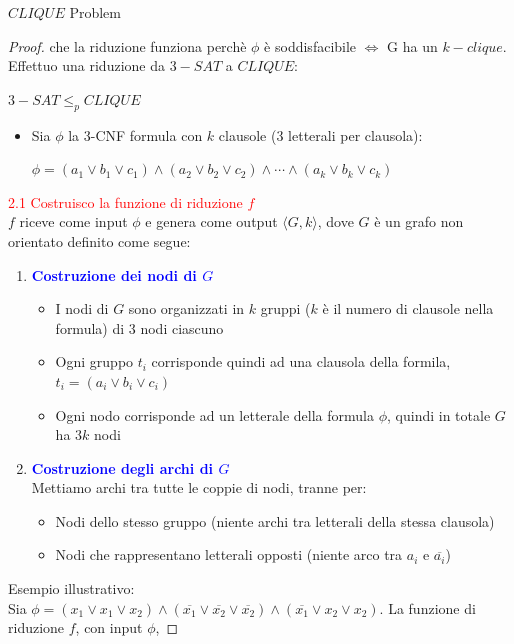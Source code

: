 \documentclass{article}  %
\theoremstyle{definition}
\begin{document}
\begin{theorem}{$CLIQUE$ Problem}
\begin{proof}
		che la riduzione funziona perchè $\phi$ è soddisfacibile $\iff$ G ha un $k-clique$. \\
		Effettuo una riduzione da $3-SAT$ a $CLIQUE$:
		\begin{center}
			$3-SAT \leq_p CLIQUE$
		\end{center}
		\begin{itemize}
			\item Sia $\phi$ la 3-CNF formula con $k$ clausole (3 letterali per clausola):
			      \begin{center}
				      $\phi = (a_1 \lor b_1 \lor c_1) \land (a_2 \lor b_2 \lor c_2) \land \cdots \land (a_k \lor b_k \lor c_k)$
			      \end{center}
		\end{itemize}
		\textcolor{red}{2.1 Costruisco la funzione di riduzione $f$} \\
		$f$ riceve come input $\phi$ e genera come output $\langle G,k \rangle$, dove $G$ è un grafo non orientato definito come segue:
		\begin{enumerate}
			\item \textcolor{blue}{\textbf{Costruzione dei nodi di $G$}}
			      \begin{itemize}
				      \item I nodi di $G$ sono organizzati in $k$ gruppi ($k$ è il numero di clausole nella formula) di 3 nodi ciascuno
				      \item Ogni gruppo $t_i$ corrisponde quindi ad una clausola della formila, $t_i=(a_i \lor b_i \lor c_i)$
				      \item Ogni nodo corrisponde ad un letterale della formula $\phi$, quindi in totale $G$ ha $3k$ nodi
			      \end{itemize}
			\item \textcolor{blue}{\textbf{Costruzione degli archi di $G$}} \\
			      Mettiamo archi tra tutte le coppie di nodi, tranne per:
			      \begin{itemize}
				      \item Nodi dello stesso gruppo (niente archi tra letterali della stessa clausola)
				      \item Nodi che rappresentano letterali opposti (niente arco tra $a_i$ e $\overline{a_i}$)
			      \end{itemize}
		\end{enumerate}
		Esempio illustrativo: \\
		Sia $\phi = (x_1 \lor x_1 \lor x_2) \land (\overline{x_1} \lor \overline{x_2} \lor \overline{x_2}) \land (\overline{x_1} \lor x_2 \lor x_2)$. La funzione di riduzione $f$, con input $\phi$,

\end{proof}
\end{theorem}
\end{document}
